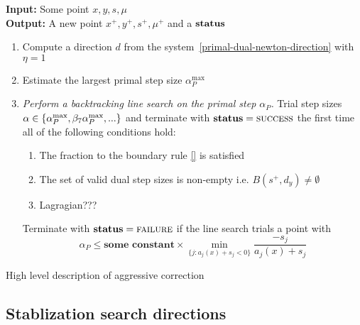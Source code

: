 \documentclass{article}
\begin{document}
\begin{algorithm}[H]
\textbf{Input:} Some point $x, y, s, \mu$ \\
\textbf{Output:} A new point $x^{+}, y^{+}, s^{+}, \mu^{+}$ and a $\textbf{status}$
\begin{enumerate}[label*=A.{\arabic*}]
\item Compute a direction $d$ from the system~\eqref{primal-dual-newton-direction} with $\eta = 1$
\item Estimate the largest primal step size $\alpha^{\max}_{P}$
\item \emph{Perform a backtracking line search on the primal step $\alpha_{P}$.} Trial step sizes $\alpha \in \{\alpha^{\max}_{P}, \beta_{7} \alpha^{\max}_{P}, ... \}$ and terminate with $\textbf{status} = \textsc{success}$ the first time all of the following conditions hold:
\begin{enumerate}[label=({\roman*})] 
\item The fraction to the boundary rule \eqref{} is satisfied 
\item The set of valid dual step sizes is non-empty i.e. $B( s^{+}, d_{y} ) \neq \emptyset$ 
\item Lagragian???
\end{enumerate}
Terminate with $\textbf{status} = \textsc{failure}$ if the line search trials a point with
 $$
\alpha_{P} \le \textbf{some constant} \times \min_{\{ j : a_j(x) + s_j < 0 \}}{ \frac{ -s_j }{ a_j(x) + s_j} }
$$
\end{enumerate}
\caption{High level description of aggressive correction}\label{alg:aggressive}
\end{algorithm}

\subsection{Stablization search directions}
\end{document}
